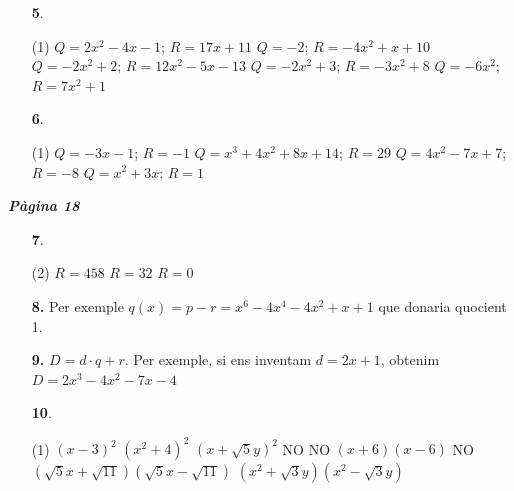 \documentclass[a4paper, pdf, twoside]{book}
\begin{document}
\begin{multicols}{2}
\begin{enumerate}

 \item[\fontfamily{phv}\selectfont\color{blue}\textbf{5}. ] 
 \begin{tasks}[column-sep=1em, item-indent=1.3333em](1)
	 \task $Q=2x^2-4x-1$; $R=17x+11$
	 \task $Q=-2$; $R=-4x^2+x+10$
	 \task $Q=-2x^2+2$; $R=12x^2-5x-13$
	 \task $Q=-2x^2+3$; $R=-3x^2+8$
	 \task $Q=-6x^2$; $R=7x^2+1$ 
\end{tasks}
\vspace{0.25cm}



 \item[\fontfamily{phv}\selectfont\color{blue}\textbf{6}. ] 
 \begin{tasks}[column-sep=1em, item-indent=1.3333em](1)
	 \task $Q=-3x-1$; $R=-1$
	 \task $Q=x^3+4x^2+8x+14$; $R=29$
	 \task $Q=4x^2-7x+7$; $R=-8$
	 \task $Q=x^2+3x$; $R=1$ 
\end{tasks}
 \end{enumerate}
\vspace{0.3cm}


{\textbf{\em Pàgina 18}} \hrulefill
\begin{enumerate}
\vspace{0.25cm}



 \item[\fontfamily{phv}\selectfont\color{blue}\textbf{7}. ] 
 \begin{tasks}[column-sep=1em, item-indent=1.3333em](2)
	 \task $R=458$
	 \task $R=32$
	 \task $R=0$
\end{tasks}
 \end{enumerate}
\begin{enumerate}
\vspace{0.25cm}
\item[\fontfamily{phv}\selectfont\color{blue}\textbf{8. }] 
Per exemple $q(x)=p-r=x^6-4x^4-4x^2+x+1$ que donaria quocient 1.
\vspace{0.25cm}
\item[\fontfamily{phv}\selectfont\color{blue}\textbf{9. }] 
$D=d\cdot q + r$. Per exemple, si ens inventam $d=2x+1$, obtenim $D=2x^3-4x^2-7x-4$
\vspace{0.25cm}



 \item[\fontfamily{phv}\selectfont\color{blue}\textbf{10}. ] 
 \begin{tasks}[column-sep=1em, item-indent=1.3333em](1)
	 \task $(x-3)^2$
	 \task $(x^2+4)^2$
	 \task $(x+\sqrt {5}y)^2$
	 \task NO
	 \task NO
	 \task $(x+6)(x-6)$
	 \task NO
	 \task* $(\sqrt {5}x+\sqrt {11})(\sqrt {5}x-\sqrt {11})$
	 \task* $(x^2+\sqrt {3}y)(x^2-\sqrt {3}y)$
\end{tasks}
\vspace{0.25cm}



\end{enumerate}
\end{multicols}
\end{document}
